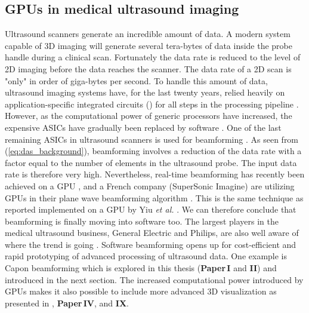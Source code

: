 
\subsection{GPUs in medical ultrasound imaging}
Ultrasound scanners generate an incredible amount of data. A modern system capable of 3D imaging will generate several tera-bytes of data inside the probe handle during a clinical scan. Fortunately the data rate is reduced to the level of 2D imaging before the data reaches the scanner. The data rate of a 2D scan is "only" in order of giga-bytes per second. To handle this amount of data, ultrasound imaging systems have, for the last twenty years, relied heavily on application-specific integrated circuits () for all steps in the processing pipeline \cite{Thomenius}. However, as the computational power of generic processors have increased, the expensive ASICs have gradually been replaced by software \cite{Guracar2013}. One of  the last remaining ASICs in ultrasound scanners is used for beamforming \cite{Thomenius}. As seen from (\ref{eq:das_background}), beamforming involves a reduction of the data rate with a factor equal to the number of elements in the ultrasound probe. The input data rate is therefore very high. Nevertheless, real-time beamforming has recently been achieved on a GPU \cite{Song2012}, and a French company (SuperSonic Imagine) are utilizing GPUs in their plane wave beamforming algorithm \cite{Tanter2014}. This is the same technique as reported implemented on a GPU by Yiu \textit{et al.} \cite{Yiu2011}. We can therefore conclude that beamforming is finally moving into software too. The largest players in the medical ultrasound business, General Electric and Philips, are also well aware of where the trend is going \cite{Thomenius2012} \cite{Metz2011}. Software beamforming opens up for cost-efficient and rapid prototyping of advanced processing of ultrasound data. One example is Capon beamforming which is explored in this thesis (\textbf{Paper\,I} and \textbf{II}) and introduced in the next section. The increased computational power introduced by GPUs makes it also possible to include more advanced 3D visualization as presented in \cite{solteszova2010multidirectional}, \textbf{Paper\,IV}, and \textbf{IX}.

